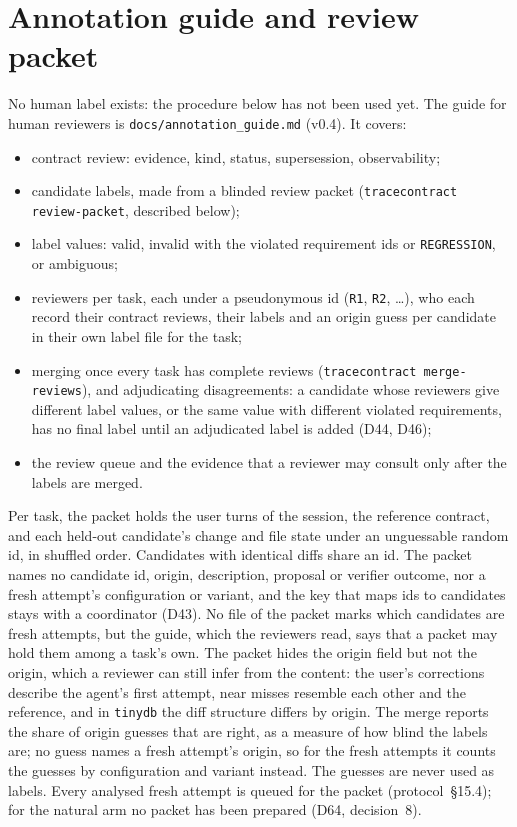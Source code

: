 \section{Annotation guide and review packet}
\label{app:annotation}
No human label exists: the procedure below has not been used yet. The guide for human reviewers is
\texttt{docs/annotation\_guide.md} (v0.4). It covers:
\begin{itemize}
\item contract review: evidence, kind, status, supersession, observability;
\item candidate labels, made from a blinded review packet (\texttt{tracecontract review-packet}, described below);
\item label values: valid, invalid with the violated requirement ids or \texttt{REGRESSION}, or ambiguous;
\item {} reviewers per task, each under a pseudonymous id (\texttt{R1}, \texttt{R2}, \dots), who
  each record their contract reviews, their labels and an origin guess per candidate in their own label file for the
  task;
\item merging once every task has  complete reviews (\texttt{tracecontract merge-reviews}),
  and adjudicating disagreements: a candidate whose reviewers give different label values, or the same value with
  different violated requirements, has no final label until an adjudicated label is added (D44, D46);
\item the review queue and the evidence that a reviewer may consult only after the labels are merged.
\end{itemize}
Per task, the packet holds the user turns of the session, the reference contract, and each held-out candidate's change
and file state under an unguessable random id, in shuffled order. Candidates with identical diffs share an id. The
packet names no candidate id, origin, description, proposal or verifier outcome, nor a fresh attempt's configuration or
variant, and the key that maps ids to candidates stays with a coordinator (D43). No file of the packet marks which
candidates are fresh attempts, but the guide, which the reviewers read, says that a packet may hold them among a task's
own. The packet hides the origin field but not the origin, which a reviewer can still infer from the content: the user's
corrections describe the agent's first attempt, near misses resemble each other and the reference, and in
\texttt{tinydb} the diff structure differs by origin. The
merge reports the share of origin guesses that are right, as a measure of how blind the labels are; no guess names a
fresh attempt's origin, so for the fresh attempts it counts the guesses by configuration and variant instead. The guesses
are never used as labels. Every analysed fresh attempt is queued for the packet (protocol~\S15.4); for the natural arm no
packet has been prepared (D64, decision~8).
